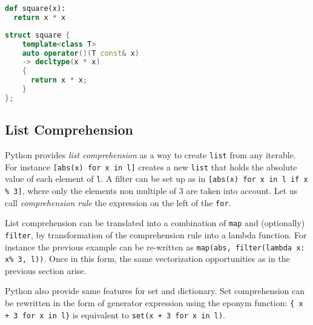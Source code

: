 \documentclass[preprint]{sigplanconf}
\begin{document}
\begin{lstlisting}[language=python, label={lst:square-python}, caption={Python implementation of the square function.}]
def square(x):
  return x * x
\end{lstlisting}

\begin{lstlisting}[language=c++, label={lst:square-cxx}, caption={C++ meta-implementation of the square function.}]
struct square {
    template<class T>
    auto operator()(T const& x)
    -> decltype(x * x)
    {
      return x * x;
    }
};
\end{lstlisting}

\subsection{List Comprehension}

Python provides \emph{list comprehension} as a way to create \texttt{list} from
any iterable. For instance \texttt{[abs(x) for x in l]} creates a new
\texttt{list} that holds the absolute value of each element of \texttt{l}. A
filter can be set up as in  \texttt{[abs(x) for x in l if x \% 3]}, where only
the elements non multiple of 3 are taken into account. Let us call
\emph{comprehension rule} the expression on the left of the
\texttt{for}.

List comprehension can be translated into a combination of \texttt{map} and
(optionally) \texttt{filter}, by transformation of the comprehension rule into
a lambda function. For instance the previous example can be re-written as
\texttt{map(abs, filter(lambda x: x\% 3, l))}. Once in this form, the same
    vectorization opportunities as in the previous section arise.


Python also provide same features for set and dictionary.  Set comprehension
can be rewritten in the form of generator expression using the eponym function:
\texttt{\{ x + 3 for x in l\}} is equivalent to \texttt{set(x + 3 for x in l)}.
\end{document}
